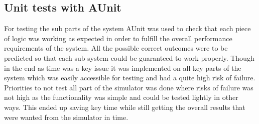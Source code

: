 \subsection{Unit tests with AUnit}

For testing the sub parts of the system AUnit was used to check that each piece of logic was working as expected in order to fulfill the overall performance requirements of the system.  All the possible correct outcomes were to be predicted so that each sub system could be guaranteed to work properly. Though in the end as time was a key issue it was implemented on all key parts of the system which was easily accessible for testing and had a quite high risk of failure. Priorities to not test all part of the simulator was done where risks of failure was not high as the functionality was simple and could be tested lightly in other ways. This ended up saving key time while still getting the overall results that were wanted from the simulator in time.

